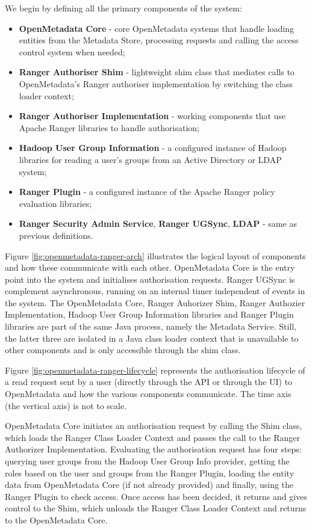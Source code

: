 We begin by defining all the primary components of the system:

\begin{itemize}
    \item \textbf{OpenMetadata Core} - core OpenMetadata systems that handle loading entities from the Metadata Store, processing requests and calling the access control system when needed;
    \item \textbf{Ranger Authoriser Shim} - lightweight shim class that mediates calls to OpenMetadata's Ranger authoriser implementation by switching the class loader context;
    \item \textbf{Ranger Authoriser Implementation} - working components that use Apache Ranger libraries to handle authorisation;
    \item \textbf{Hadoop User Group Information} - a configured instance of Hadoop libraries for reading a user's groups from an Active Directory or LDAP system;
    \item \textbf{Ranger Plugin} - a configured instance of the Apache Ranger policy evaluation libraries;
    \item \textbf{Ranger Security Admin Service}, \textbf{Ranger UGSync}, \textbf{LDAP} - same as previous definitions.
\end{itemize}

Figure \ref{fig:openmetadata-ranger-arch} illustrates the logical layout of components and how these communicate with each other. OpenMetadata Core is the entry point into the system and initialises authorisation requests. Ranger UGSync is complement asynchronous, running on an internal timer independent of events in the system. The OpenMetadata Core, Ranger Auhorizer Shim, Ranger Authozier Implementation, Hadoop User Group Information libraries and Ranger Plugin libraries are part of the same Java process, namely the Metadata Service. Still, the latter three are isolated in a Java class loader context that is unavailable to other components and is only accessible through the shim class.

Figure \ref{fig:openmetadata-ranger-lifecycle} represents the authorisation lifecycle of a read request sent by a user (directly through the API or through the UI) to OpenMetadata and how the various components communicate. The time axis (the vertical axis) is not to scale. 

OpenMetadata Core initiates an authorisation request by calling the Shim class, which loads the Ranger Class Loader Context and passes the call to the Ranger Authorizer Implementation. Evaluating the authorisation request has four steps: querying user groups from the Hadoop User Group Info provider, getting the roles based on the user and groups from the Ranger Plugin, loading the entity data from OpenMetadata Core (if not already provided) and finally, using the Ranger Plugin to check access. Once access has been decided, it returns and gives control to the Shim, which unloads the Ranger Class Loader Context and returns to the OpenMetadata Core.

